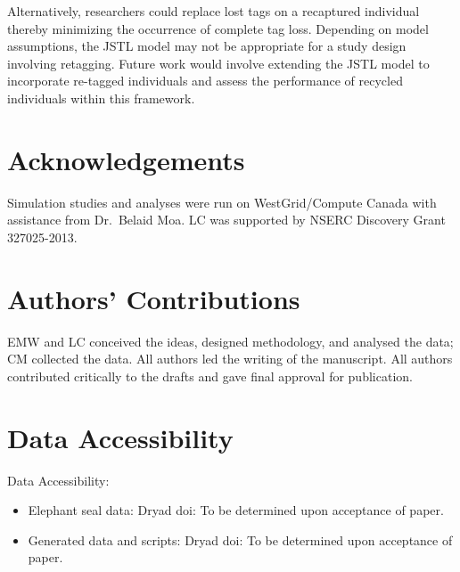 \documentclass[12pt]{article}
\begin{document}
Alternatively, researchers could replace lost tags on a recaptured individual thereby minimizing the occurrence of complete tag loss.  Depending on model assumptions, the JSTL model may not be appropriate for a study design involving retagging.  Future work would involve extending the JSTL model to  incorporate re-tagged individuals and assess the performance of recycled individuals within this framework. 

\section{Acknowledgements}\label{acknowledgements}
Simulation studies and analyses were run on WestGrid/Compute Canada with
assistance from Dr.~Belaid Moa. LC was supported by NSERC Discovery Grant 327025-2013.


\section{Authors' Contributions}
EMW and LC conceived the ideas, designed methodology, and analysed the data; CM collected the data. All authors led the writing of the manuscript.  All authors contributed critically to the drafts and gave final approval for publication.

\section{Data Accessibility}
Data Accessibility:
\begin{itemize}
\item Elephant seal data: Dryad doi: To be determined upon acceptance of paper.
\item Generated data and scripts: Dryad doi: To be determined upon acceptance of paper.
\end{itemize}






\bigskip




\end{document}
